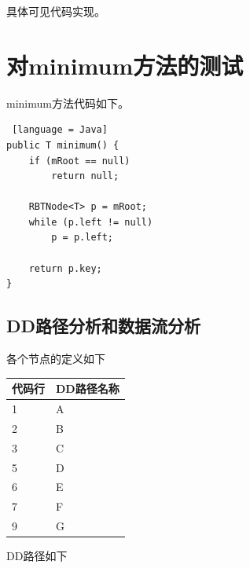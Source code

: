 \documentclass[12pt, a4paper, oneside]{ctexart}
\begin{document}
具体可见代码实现。

\section{对minimum方法的测试}

minimum方法代码如下。

\begin{lstlisting} [language = Java]
public T minimum() {
    if (mRoot == null)
        return null;

    RBTNode<T> p = mRoot;
    while (p.left != null)
        p = p.left;

    return p.key;
}
\end{lstlisting}

\subsection{DD路径分析和数据流分析}

各个节点的定义如下

\begin{table}[!h]
    \begin{tabular}{|l|l|}
    \hline
    代码行 & DD路径名称\\ \hline
    1 & A\\ \hline
    2 & B\\ \hline
    3 & C \\ \hline
    5 & D \\ \hline
    6 & E \\ \hline
    7 & F \\ \hline
    9 & G \\ \hline
    \end{tabular}
\end{table}

DD路径如下
\end{document}
